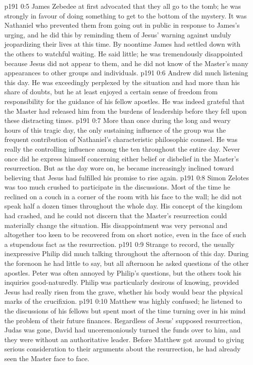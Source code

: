 \vs p191 0:5 James Zebedee at first advocated that they all go to the tomb; he was strongly in favour of doing something to get to the bottom of the mystery. It was Nathaniel who prevented them from going out in public in response to James’s urging, and he did this by reminding them of Jesus’ warning against unduly jeopardizing their lives at this time. By noontime James had settled down with the others to watchful waiting. He said little; he was tremendously disappointed because Jesus did not appear to them, and he did not know of the Master’s many appearances to other groups and individuals.
\vs p191 0:6 Andrew did much listening this day. He was exceedingly perplexed by the situation and had more than his share of doubts, but he at least enjoyed a certain sense of freedom from responsibility for the guidance of his fellow apostles. He was indeed grateful that the Master had released him from the burdens of leadership before they fell upon these distracting times.
\vs p191 0:7 More than once during the long and weary hours of this tragic day, the only sustaining influence of the group was the frequent contribution of Nathaniel’s characteristic philosophic counsel. He was really the controlling influence among the ten throughout the entire day. Never once did he express himself concerning either belief or disbelief in the Master’s resurrection. But as the day wore on, he became increasingly inclined toward believing that Jesus had fulfilled his promise to rise again.
\vs p191 0:8 Simon Zelotes was too much crushed to participate in the discussions. Most of the time he reclined on a couch in a corner of the room with his face to the wall; he did not speak half a dozen times throughout the whole day. His concept of the kingdom had crashed, and he could not discern that the Master’s resurrection could materially change the situation. His disappointment was very personal and altogether too keen to be recovered from on short notice, even in the face of such a stupendous fact as the resurrection.
\vs p191 0:9 Strange to record, the usually inexpressive Philip did much talking throughout the afternoon of this day. During the forenoon he had little to say, but all afternoon he asked questions of the other apostles. Peter was often annoyed by Philip’s questions, but the others took his inquiries good\hyp{}naturedly. Philip was particularly desirous of knowing, provided Jesus had really risen from the grave, whether his body would bear the physical marks of the crucifixion.
\vs p191 0:10 Matthew was highly confused; he listened to the discussions of his fellows but spent most of the time turning over in his mind the problem of their future finances. Regardless of Jesus’ supposed resurrection, Judas was gone, David had unceremoniously turned the funds over to him, and they were without an authoritative leader. Before Matthew got around to giving serious consideration to their arguments about the resurrection, he had already seen the Master face to face.
